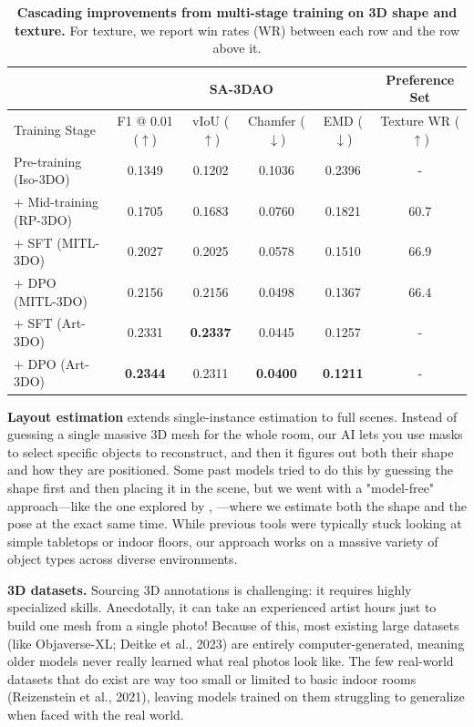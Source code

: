\documentclass[manuscript,review]{acmart}
\begin{document}
\vspace{2\baselineskip}

\begin{table}[ht]
    \centering
    \begin{tabular}{l c c c c c}
\hline
      & \multicolumn{4}{c}{SA-3DAO} & Preference Set \\ \hline
    Training Stage & F1 @ 0.01 ($\uparrow$) & vIoU ($\uparrow$) & Chamfer ($\downarrow $)& EMD ($\downarrow$) & Texture WR ($\uparrow$)\\

    Pre-training (Iso-3DO) & 0.1349 & 0.1202 & 0.1036 & 0.2396 & - \\
    $+$ Mid-training (RP-3DO) & 0.1705 & 0.1683 & 0.0760 & 0.1821 & 60.7\\
    $+$ SFT (MITL-3DO)& 0.2027 & 0.2025 &0.0578 &0.1510 &66.9\\
    $+$ DPO (MITL-3DO)& 0.2156 & 0.2156 &0.0498 &0.1367 &66.4\\
    $+$ SFT (Art-3DO) & 0.2331 & \textbf{0.2337} &0.0445 &0.1257 &-\\
    $+$ DPO (Art-3DO) & \textbf{0.2344} & 0.2311 &\textbf{0.0400} &\textbf{0.1211} &-\\
\end{tabular}
\vspace{1\baselineskip}
    \caption{\textbf{Cascading improvements from multi-stage training on 3D shape and texture.} For texture, we report win rates (WR) between each row and the row above it.}
    \label{multi-stage training}
\end{table}

\textbf{Layout estimation} extends single-instance estimation to full scenes. Instead of guessing a single massive 3D mesh for the whole room, our AI lets you use masks to select specific objects to reconstruct, and then it figures out both their shape and how they are positioned. Some past models tried to do this by guessing the shape first and then placing it in the scene, but we went with a "model-free" approach—like the one explored by \citet{brazil2023omni3d}, \citeyear{brazil2023omni3d} —where we estimate both the shape and the pose at the exact same time. While previous tools were typically stuck looking at simple tabletops or indoor floors, our approach works on a massive variety of object types across diverse environments.

\textbf{3D datasets.} Sourcing 3D annotations is challenging: it requires highly specialized skills. Anecdotally, it can take an experienced artist hours just to build one mesh from a single photo! Because of this, most existing large datasets (like Objaverse-XL; Deitke et al., 2023) are entirely computer-generated, meaning older models never really learned what real photos look like. The few real-world datasets that do exist are way too small or limited to basic indoor rooms (Reizenstein et al., 2021), leaving models trained on them struggling to generalize when faced with the real world.
\end{document}
